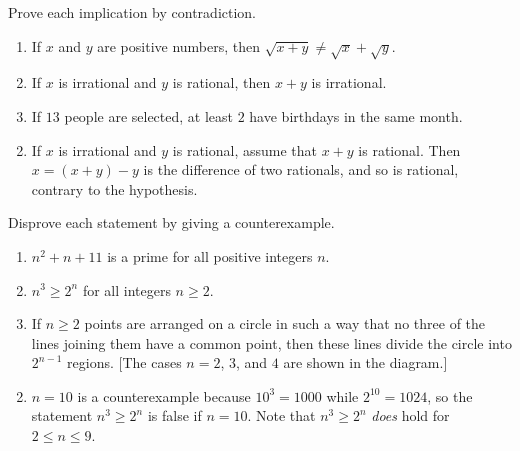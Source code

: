 \begin{multicols}{2}
\begin{ex}
\begin{sol}
\begin{enumerate}[label={\alph*.}]
\end{enumerate}
\end{sol}
\end{ex}

\begin{ex}
Prove each implication by contradiction.


\begin{enumerate}[label={\alph*.}]
\item If $x$ and $y$ are positive numbers, then \newline $\sqrt{x + y} \neq \sqrt{x} + \sqrt{y}$.

\item If $x$ is irrational and $y$ is rational, then $x + y$ is irrational.

\item If $13$ people are selected, at least $2$ have birthdays in the same month.

\end{enumerate}
\begin{sol}
\begin{enumerate}[label={\alph*.}]
\setcounter{enumi}{1}
\item  If $x$ is irrational and $y$ is rational, assume that $x + y$ is rational. Then $x = (x + y) - y$ is the difference of two rationals, and so is rational, contrary to the hypothesis.

\end{enumerate}
\end{sol}
\end{ex}

\begin{ex}
Disprove each statement by giving a counterexample.


\begin{enumerate}[label={\alph*.}]
\item $n^{2} + n + 11$ is a prime for all positive integers $n$.

\item $n^{3} \geq 2^n$ for all integers $n \geq 2$.

\item If $n \geq 2$ points are arranged on a circle in such a way that no three of the 
lines joining them have a common point, then these lines divide the 
circle into $2^{n-1}$ regions. [The cases $n = 2$, $3$, and $4$ are shown in the diagram.]
\begin{figure}[H]
\centering

\end{figure}
\end{enumerate}
\begin{sol}
\begin{enumerate}[label={\alph*.}]
\setcounter{enumi}{1}
\item  $n = 10$ is a counterexample because $10^3 = 1000$ while $2^{10} = 1024$, so the statement $n^{3} \geq 2^n$ is false if $n = 10$. Note that $n^{3} \geq 2^n$ \textit{does} hold for $2 \leq n \leq 9$.


\end{enumerate}
\end{sol}
\end{ex}
\end{multicols}
